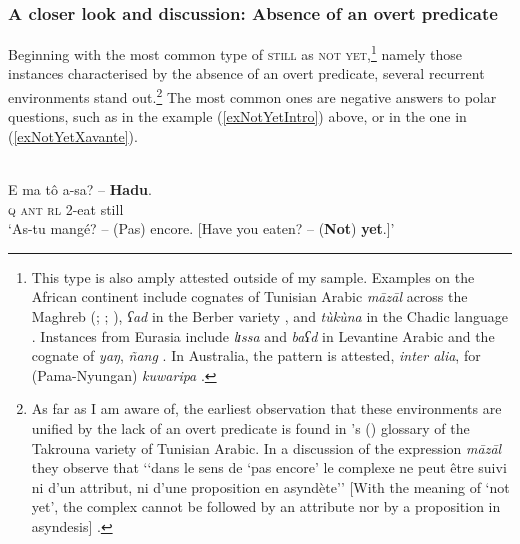 \subsubsection{A closer look and discussion: Absence of an overt predicate} 
Beginning with the most common type of \textsc{still} as \textsc{not yet},\footnote{This type is also  amply attested outside of my sample. Examples on the African continent include cognates of Tunisian Arabic \textit{māzāl} across the Maghreb (\cite[196]{Caubet1993}; \cite[430]{Pereira2010}; \cite[197–198]{Tapiero1978}), \textit{ʕad} in the Berber variety  \parencite{Fanego2021}, and \textit{tùkùna} in the Chadic language  \parencite[211]{Newman2007}. Instances from Eurasia include \textit{lɪssa} and \textit{baʕd} in Levantine Arabic \parencite[189–192]{MacNeillHoyt2010} and the  cognate of  \textit{yaŋ}, \textit{ñang} \parencite[207–208]{Enfield2007}. In Australia, the pattern is attested, \textit{inter alia}, for  (Pama-Nyungan) \textit{kuwaripa} \parencite[186–187]{EckertHudson1988}.} namely those instances characterised by the absence of an overt predicate, several recurrent environments stand out.\footnote{As far as I am aware of, the earliest observation that these environments are unified by the lack of an overt predicate is found in \citeauthor{MarcaisGuiga19581961}'s (\citeyear{MarcaisGuiga19581961}) glossary of the Takrouna variety of Tunisian Arabic. In a discussion of the expression \textit{māzāl} they observe that \lq\lq dans le sens de \lq pas encore\rq{ }le complexe ne peut être suivi ni d'un attribut, ni d'une proposition en asyndète\rq\rq{ }[With the meaning of \lq not yet\rq, the complex cannot be followed by an attribute nor by a proposition in asyndesis] \parencite[1740]{MarcaisGuiga19581961}.} The most common ones are negative answers to polar questions, such as in the  example (\ref{exNotYetIntro}) above, or in the  one in (\ref{exNotYetXavante}).

\begin{exe}
	\ex {}\label{exNotYetXavante}\\
	\gll E ma tô a-sa? – \textbf{Hadu}.\\
	\textsc{q} \textsc{ant} \textsc{rl} 2-eat {} still\\
	\glt \lq As-tu mangé? -- (Pas) encore. [Have you eaten? -- (\textbf{Not}) \textbf{yet}.]\rq{ }
	\parencite[107]{Estevam2011}
\end{exe}

